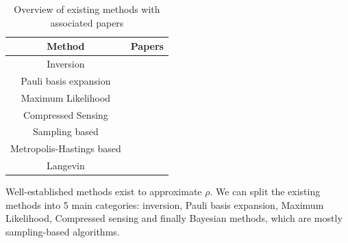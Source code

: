 \documentclass[12pt]{memoir}
\begin{document}
\begin{table}[H]

\begin{center}
    \begin{tabular}{|c|c|}
        \hline
        Method & Papers \\\hline\hline
        Inversion & \cite{meth:linear-inversion:vogel-risken, meth:linear-inversion:RMH, meth:linear-inversion:alquier} \\\hline
        Pauli basis expansion & \cite{Cai-2016}\\\hline
        Maximum Likelihood & \cite{Guta20,meth:ML:BDP,meth:ML:JKMW,meth:ML:Lvovsky,meth:ML:Blume-Kohout,meth:ML:Suzuki,meth:ML:Hradil2004} \\\hline
        Compressed Sensing & \cite{meth:CS:GLFSBE10,meth:CS:Gross-2011, meth:CS:Flammia-2012,meth:CS:Koltchinskii-2011}\\\hline
        Sampling based & \cite{meth:bayesian:smc:Ferrie-2014,meth:bayesian:smc:Kueng-2015, meth:bayesian:smc:Granade_2016,meth:bayesian:sis:Kravtsov-2013}\\\hline
        Metropolis-Hastings based & \cite{MA17,Mai22,LLJL20, meth:bayesian:mh:Cotter2013, meth:bayesian:mh:Blume-Kohout-2010}\\\hline
        Langevin & \cite{meth:bayesian:Langevin:ACMT2024}\\\hline
    \end{tabular}
\end{center}
\caption{Overview of existing methods with associated papers}
\label{table:methods-comp}
\end{table}


Well-established methods exist to approximate $\rho$. We can split the existing methods into 5 main categories: inversion, Pauli basis expansion, Maximum Likelihood, Compressed sensing and finally Bayesian methods, which are mostly sampling-based algorithms.\medbreak
\end{document}
